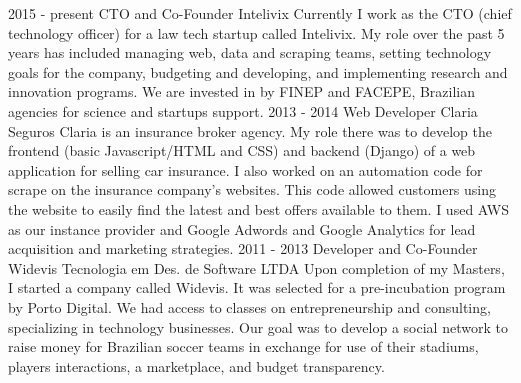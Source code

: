 
\cvevent
    {2015 - present}
    {CTO and Co-Founder}
    {Intelivix}
    {Currently I work as the CTO (chief technology officer) for a law tech startup called Intelivix. My role over the past 5 years has included managing web, data and scraping teams, setting technology goals for the company, budgeting and developing, and implementing research and innovation programs. We are invested in by FINEP and FACEPE, Brazilian agencies for science and startups support.}
    {}
    {}
    {}
\cvevent
    {2013 - 2014}
    {Web Developer}
    {Claria Seguros}
    {Claria is an insurance broker agency. My role there was to develop the frontend (basic Javascript/HTML and CSS) and backend (Django) of a web application for selling car insurance. I also worked on an automation code for scrape on the insurance company’s websites. This code allowed customers using the website to easily find the latest and best offers available to them. I used AWS as our instance provider and Google Adwords and Google Analytics for lead acquisition and marketing strategies.}
    {}
    {}
    {}
\cvevent
    {2011 - 2013}
    {Developer and Co-Founder}
    {Widevis Tecnologia em Des. de Software LTDA}
    {Upon completion of my Masters, I started a company called Widevis. It was selected for a pre-incubation program by Porto Digital. We had access to classes on entrepreneurship and consulting, specializing in technology businesses. Our goal was to develop a social network to raise money for Brazilian soccer teams in exchange for use of their stadiums, players interactions, a marketplace, and budget transparency.}
